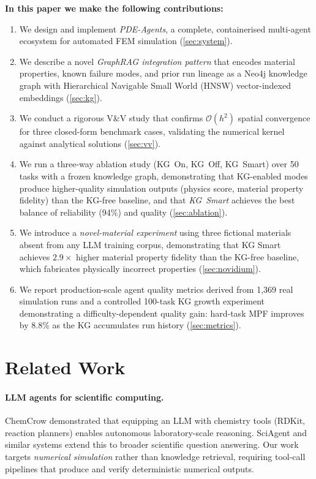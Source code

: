 \documentclass[twocolumn]{article}
\begin{document}
\textbf{In this paper we make the following contributions:}
\begin{enumerate}
  \item We design and implement \textit{PDE-Agents}, a complete, containerised
        multi-agent ecosystem for automated FEM simulation
        (\cref{sec:system}).
  \item We describe a novel \emph{GraphRAG integration pattern} that encodes
        material properties, known failure modes, and prior run lineage as a
        Neo4j knowledge graph with Hierarchical Navigable Small World
        (HNSW) vector-indexed embeddings (\cref{sec:kg}).
  \item We conduct a rigorous V\&V study that confirms $\mathcal{O}(h^2)$
        spatial convergence for three closed-form benchmark cases, validating
        the numerical kernel against analytical solutions
        (\cref{sec:vv}).
  \item We run a three-way ablation study (KG~On, KG~Off, KG~Smart)
        over 50 tasks with a frozen knowledge graph, demonstrating that
        KG-enabled modes produce higher-quality simulation outputs
        (physics score, material property fidelity) than the KG-free
        baseline, and that \emph{KG~Smart} achieves the best balance of
        reliability (94\%) and quality (\cref{sec:ablation}).
  \item We introduce a \emph{novel-material experiment} using three
        fictional materials absent from any LLM training corpus,
        demonstrating that KG Smart achieves $2.9\times$ higher
        material property fidelity than the KG-free baseline, which
        fabricates physically incorrect properties (\cref{sec:novidium}).
  \item We report production-scale agent quality metrics derived from
        1{,}369 real simulation runs and a controlled 100-task KG
        growth experiment demonstrating a difficulty-dependent quality
        gain: hard-task MPF improves by 8.8\% as the KG accumulates
        run history (\cref{sec:metrics}).
\end{enumerate}

\section{Related Work}
\label{sec:related}

\paragraph{LLM agents for scientific computing.}
ChemCrow \citep{bran2023chemcrow} demonstrated that equipping an LLM with
chemistry tools (RDKit, reaction planners) enables autonomous laboratory-scale
reasoning.  SciAgent \citep{ma2024sciagent} and similar systems extend this
to broader scientific question answering.  Our work targets \emph{numerical
simulation} rather than knowledge retrieval, requiring tool-call pipelines that
produce and verify deterministic numerical outputs.
\end{document}
